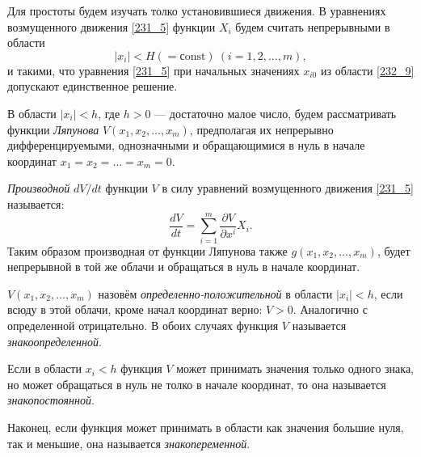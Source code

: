 Для простоты будем изучать толко установившиеся движения.
В уравнениях возмущенного движения \eqref{231_5} функции $X_i$ будем считать непрерывными в области
\begin{equation}
	|x_i| < H(= \text{сonst}) \ (i = 1,2,\ldots,m),
	\label{232_9}
\end{equation}
и такими, что уравнения \eqref{231_5} при начальных значениях $x_{i0}$ из области \eqref{232_9} допускают единственное решение.

\begin{to_def}
	В области $|x_i| < h$, где $h>0$ --- достаточно малое число, будем рассматривать функции \textit{Ляпунова} $V(x_1, x_2, \ldots, x_m)$, предполагая их непрерывно дифференцируемыми, однозначными и обращающимися в нуль в начале координат $x_1 = x_2= \ldots = x_m = 0$.
\end{to_def}
\begin{to_def}
	\textit{Производной} $d V/ d t$ функции $V$ в силу уравнений возмущенного движения \eqref{231_5} называется:
	\begin{equation*}
	 	\frac{d V}{d t} = \sum_{i = 1}^m \frac{\partial V}{\partial x^i} X_i.
	 \end{equation*} 
	 Таким образом производная от функции Ляпунова также $g(x_1,x_2, \ldots, x_m)$, будет непрерывной в той же облачи и обращаться в нуль в начале координат.
\end{to_def}

\begin{to_def}
	$V(x_1, x_2, \ldots, x_m)$ назовём \textit{определенно-положительной} в области $|x_i|<h$, если всюду в этой облачи, кроме начал координат верно: $V >0$.
	Аналогично с определенной отрицательно. В обоих случаях функция $V$ называется \textit{знакоопределенной}.
\end{to_def}

\begin{to_def}
	Если в области $x_i < h$ функция $V$ может принимать значения только одного знака, но может обращаться в нуль не толко в начале координат, то она называется \textit{знакопостоянной}.
\end{to_def}

\begin{to_def}
	Наконец, если функция может принимать в области как значения большие нуля, так и меньшие, она называется \textit{знакопеременной}. 
\end{to_def}